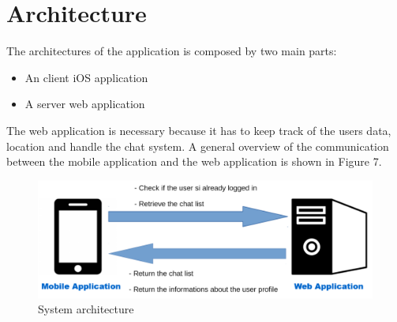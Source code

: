 \section{Architecture}
The architectures of the application is composed by two main parts:
\begin{itemize}
\item An client iOS application
\item A server web application
\end{itemize}
The web application is necessary because it has to keep track of the users data, location and handle the chat system. A general overview of the communication between the mobile application and the web application is shown in Figure 7.

\begin{figure}[H]
\centering
\includegraphics[width=1\textwidth]{./images/architecture.png}
\caption{System architecture}
\label{architecture}
\end{figure}